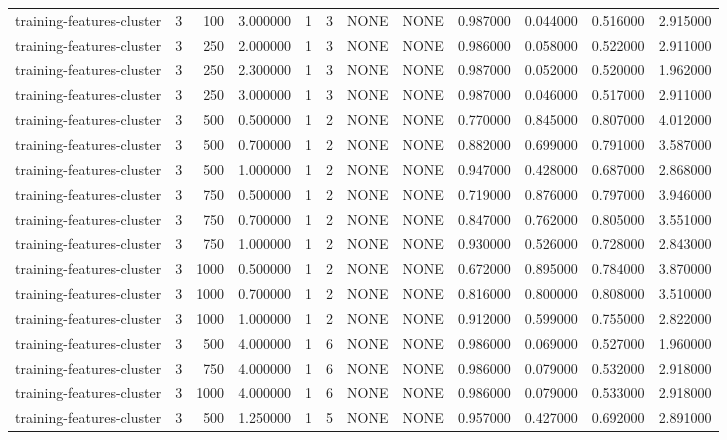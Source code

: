 \begin{tabular}{lrrrllllrrrr}
training-features-cluster & 3 & 100 & 3.000000 & 1 & 3 & NONE & NONE & 0.987000 & 0.044000 & 0.516000 & 2.915000 \\
training-features-cluster & 3 & 250 & 2.000000 & 1 & 3 & NONE & NONE & 0.986000 & 0.058000 & 0.522000 & 2.911000 \\
training-features-cluster & 3 & 250 & 2.300000 & 1 & 3 & NONE & NONE & 0.987000 & 0.052000 & 0.520000 & 1.962000 \\
training-features-cluster & 3 & 250 & 3.000000 & 1 & 3 & NONE & NONE & 0.987000 & 0.046000 & 0.517000 & 2.911000 \\
training-features-cluster & 3 & 500 & 0.500000 & 1 & 2 & NONE & NONE & 0.770000 & 0.845000 & 0.807000 & 4.012000 \\
training-features-cluster & 3 & 500 & 0.700000 & 1 & 2 & NONE & NONE & 0.882000 & 0.699000 & 0.791000 & 3.587000 \\
training-features-cluster & 3 & 500 & 1.000000 & 1 & 2 & NONE & NONE & 0.947000 & 0.428000 & 0.687000 & 2.868000 \\
training-features-cluster & 3 & 750 & 0.500000 & 1 & 2 & NONE & NONE & 0.719000 & 0.876000 & 0.797000 & 3.946000 \\
training-features-cluster & 3 & 750 & 0.700000 & 1 & 2 & NONE & NONE & 0.847000 & 0.762000 & 0.805000 & 3.551000 \\
training-features-cluster & 3 & 750 & 1.000000 & 1 & 2 & NONE & NONE & 0.930000 & 0.526000 & 0.728000 & 2.843000 \\
training-features-cluster & 3 & 1000 & 0.500000 & 1 & 2 & NONE & NONE & 0.672000 & 0.895000 & 0.784000 & 3.870000 \\
training-features-cluster & 3 & 1000 & 0.700000 & 1 & 2 & NONE & NONE & 0.816000 & 0.800000 & 0.808000 & 3.510000 \\
training-features-cluster & 3 & 1000 & 1.000000 & 1 & 2 & NONE & NONE & 0.912000 & 0.599000 & 0.755000 & 2.822000 \\
training-features-cluster & 3 & 500 & 4.000000 & 1 & 6 & NONE & NONE & 0.986000 & 0.069000 & 0.527000 & 1.960000 \\
training-features-cluster & 3 & 750 & 4.000000 & 1 & 6 & NONE & NONE & 0.986000 & 0.079000 & 0.532000 & 2.918000 \\
training-features-cluster & 3 & 1000 & 4.000000 & 1 & 6 & NONE & NONE & 0.986000 & 0.079000 & 0.533000 & 2.918000 \\
training-features-cluster & 3 & 500 & 1.250000 & 1 & 5 & NONE & NONE & 0.957000 & 0.427000 & 0.692000 & 2.891000 \\

\end{tabular}
